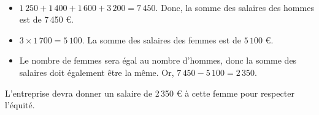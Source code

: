 \ \\ [-5mm]
\begin{itemize}
   \item $1\,250+1\,400+1\,600+3\,200 =7\,450$. Donc, la somme des salaires des hommes est de 7\,450 \euro.
   \item $3\times1\,700 =5\,100$. La somme des salaires des femmes est de $5\,100$ \euro.
   \item Le nombre de femmes sera égal au nombre d'hommes, donc la somme des salaires doit également être la même. Or, $7\,450-5\,100 =2\,350$.
\end{itemize}
   {\blue L'entreprise devra donner un salaire de 2\,350 \euro{} à cette femme pour respecter l'équité.} \\
